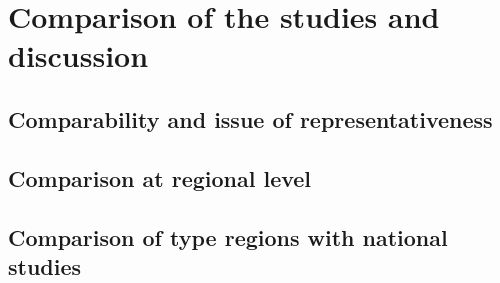 \chapter{Comparison of the studies and discussion}



\section{Comparability and issue of representativeness}






\section{Comparison at regional level}






\section{Comparison of type regions with national studies}